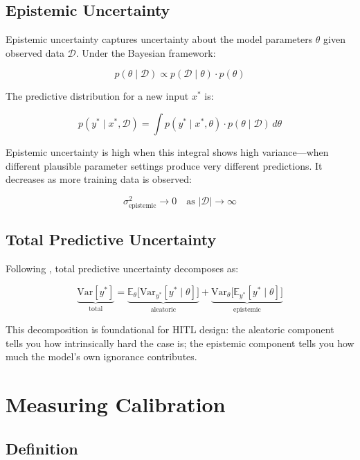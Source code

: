 \subsection{Epistemic Uncertainty}

Epistemic uncertainty captures uncertainty about the model parameters $\theta$ given observed data $\mathcal{D}$. Under the Bayesian framework:

\[
p(\theta \mid \mathcal{D}) \propto p(\mathcal{D} \mid \theta) \cdot p(\theta)
\]

The predictive distribution for a new input $x^*$ is:

\[
p(y^* \mid x^*, \mathcal{D}) = \int p(y^* \mid x^*, \theta) \cdot p(\theta \mid \mathcal{D}) \, d\theta
\]

Epistemic uncertainty is high when this integral shows high variance---when different plausible parameter settings produce very different predictions. It decreases as more training data is observed:

\[
\sigma^2_{\text{epistemic}} \to 0 \quad \text{as } |\mathcal{D}| \to \infty
\]

\subsection{Total Predictive Uncertainty}

Following \textcite{kendall2017uncertainties}, total predictive uncertainty decomposes as:

\[
\underbrace{\text{Var}[y^*]}_{\text{total}} = \underbrace{\mathbb{E}_{\theta}\bigl[\text{Var}_{y^*}[y^* \mid \theta]\bigr]}_{\text{aleatoric}} + \underbrace{\text{Var}_{\theta}\bigl[\mathbb{E}_{y^*}[y^* \mid \theta]\bigr]}_{\text{epistemic}}
\]

This decomposition is foundational for HITL design: the aleatoric component tells you how intrinsically hard the case is; the epistemic component tells you how much the model's own ignorance contributes.

\section{Measuring Calibration}

\subsection{Definition}

